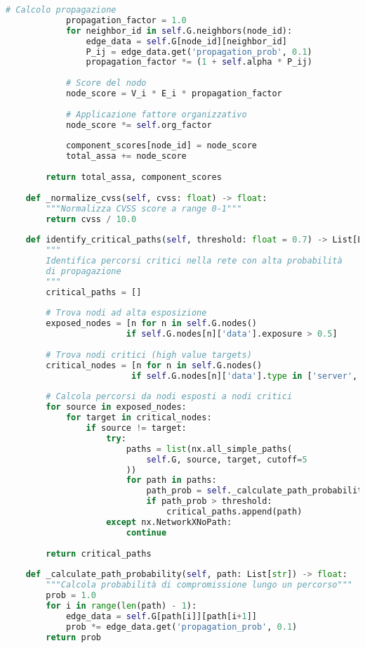 \begin{lstlisting}[language=Python, caption=Implementazione dell'algoritmo ASSA-GDO]
            # Calcolo propagazione
            propagation_factor = 1.0
            for neighbor_id in self.G.neighbors(node_id):
                edge_data = self.G[node_id][neighbor_id]
                P_ij = edge_data.get('propagation_prob', 0.1)
                propagation_factor *= (1 + self.alpha * P_ij)
            
            # Score del nodo
            node_score = V_i * E_i * propagation_factor
            
            # Applicazione fattore organizzativo
            node_score *= self.org_factor
            
            component_scores[node_id] = node_score
            total_assa += node_score
            
        return total_assa, component_scores
    
    def _normalize_cvss(self, cvss: float) -> float:
        """Normalizza CVSS score a range 0-1"""
        return cvss / 10.0
    
    def identify_critical_paths(self, threshold: float = 0.7) -> List[List[str]]:
        """
        Identifica percorsi critici nella rete con alta probabilità
        di propagazione
        """
        critical_paths = []
        
        # Trova nodi ad alta esposizione
        exposed_nodes = [n for n in self.G.nodes() 
                        if self.G.nodes[n]['data'].exposure > 0.5]
        
        # Trova nodi critici (high value targets)
        critical_nodes = [n for n in self.G.nodes()
                         if self.G.nodes[n]['data'].type in ['server', 'database']]
        
        # Calcola percorsi da nodi esposti a nodi critici
        for source in exposed_nodes:
            for target in critical_nodes:
                if source != target:
                    try:
                        paths = list(nx.all_simple_paths(
                            self.G, source, target, cutoff=5
                        ))
                        for path in paths:
                            path_prob = self._calculate_path_probability(path)
                            if path_prob > threshold:
                                critical_paths.append(path)
                    except nx.NetworkXNoPath:
                        continue
                        
        return critical_paths
    
    def _calculate_path_probability(self, path: List[str]) -> float:
        """Calcola probabilità di compromissione lungo un percorso"""
        prob = 1.0
        for i in range(len(path) - 1):
            edge_data = self.G[path[i]][path[i+1]]
            prob *= edge_data.get('propagation_prob', 0.1)
        return prob
    

\end{lstlisting}
